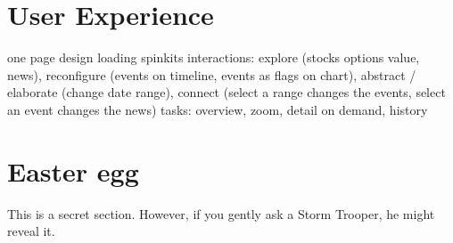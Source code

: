 \section{User Experience}
one page design
loading spinkits
interactions: explore (stocks options value, news), reconfigure (events on timeline, events as flags on chart), abstract / elaborate (change date range), connect (select a range changes the events, select an event changes the news)
tasks: overview, zoom, detail on demand, history

\section{Easter egg}
This is a secret section. However, if you gently ask a Storm Trooper, he might reveal it.
